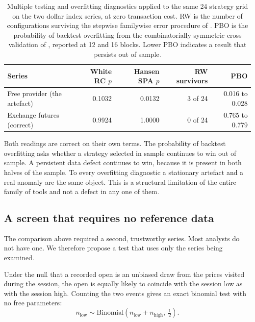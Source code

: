 \documentclass[10pt]{article}
\begin{document}
\begin{table}[H]
\caption{Multiple testing and overfitting diagnostics applied to the same 24 strategy grid
on the two dollar index series, at zero transaction cost. RW is the number of
configurations surviving the stepwise familywise error procedure of
\citet{romanowolf2005}. PBO is the probability of backtest overfitting from the
combinatorially symmetric cross validation of \citet{bailey2017}, reported at 12 and 16
blocks. Lower PBO indicates a result that persists out of sample.}
\label{tab:diagnostics}
\begin{tabularx}{\textwidth}{Lrrrr}
\toprule
\textbf{Series} & \textbf{White RC $p$} & \textbf{Hansen SPA $p$} & \textbf{RW survivors} & \textbf{PBO} \\
\midrule
Free provider (the artefact) & 0.1032 & 0.0132 & 3 of 24 & 0.016 to 0.028 \\
Exchange futures (correct)   & 0.9924 & 1.0000 & 0 of 24 & 0.765 to 0.779 \\
\bottomrule
\end{tabularx}
\end{table}

Both readings are correct on their own terms. The probability of backtest overfitting asks
whether a strategy selected in sample continues to win out of sample. A persistent data
defect continues to win, because it is present in both halves of the sample. To every
overfitting diagnostic a stationary artefact and a real anomaly are the same object. This
is a structural limitation of the entire family of tools and not a defect in any one of
them.

\subsection{A screen that requires no reference data}

The comparison above required a second, trustworthy series. Most analysts do not have one.
We therefore propose a test that uses only the series being examined.

Under the null that a recorded open is an unbiased draw from the prices visited during the
session, the open is equally likely to coincide with the session low as with the session
high. Counting the two events gives an exact binomial test with no free parameters:
\begin{equation}
n_{\text{low}} \sim \mathrm{Binomial}\!\left(n_{\text{low}}+n_{\text{high}},\ \tfrac{1}{2}\right).
\label{eq:binom}
\end{equation}
\end{document}
